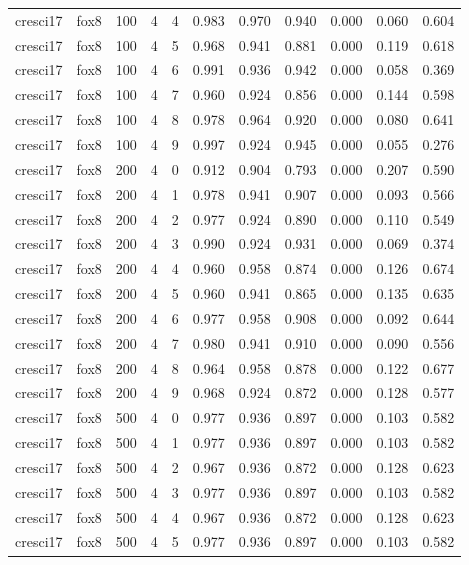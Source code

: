 \begin{tabular}{llrrrrrrrrr}
cresci17 & fox8 & 100 & 4 & 4 & 0.983 & 0.970 & 0.940 & 0.000 & 0.060 & 0.604 \\
cresci17 & fox8 & 100 & 4 & 5 & 0.968 & 0.941 & 0.881 & 0.000 & 0.119 & 0.618 \\
cresci17 & fox8 & 100 & 4 & 6 & 0.991 & 0.936 & 0.942 & 0.000 & 0.058 & 0.369 \\
cresci17 & fox8 & 100 & 4 & 7 & 0.960 & 0.924 & 0.856 & 0.000 & 0.144 & 0.598 \\
cresci17 & fox8 & 100 & 4 & 8 & 0.978 & 0.964 & 0.920 & 0.000 & 0.080 & 0.641 \\
cresci17 & fox8 & 100 & 4 & 9 & 0.997 & 0.924 & 0.945 & 0.000 & 0.055 & 0.276 \\
cresci17 & fox8 & 200 & 4 & 0 & 0.912 & 0.904 & 0.793 & 0.000 & 0.207 & 0.590 \\
cresci17 & fox8 & 200 & 4 & 1 & 0.978 & 0.941 & 0.907 & 0.000 & 0.093 & 0.566 \\
cresci17 & fox8 & 200 & 4 & 2 & 0.977 & 0.924 & 0.890 & 0.000 & 0.110 & 0.549 \\
cresci17 & fox8 & 200 & 4 & 3 & 0.990 & 0.924 & 0.931 & 0.000 & 0.069 & 0.374 \\
cresci17 & fox8 & 200 & 4 & 4 & 0.960 & 0.958 & 0.874 & 0.000 & 0.126 & 0.674 \\
cresci17 & fox8 & 200 & 4 & 5 & 0.960 & 0.941 & 0.865 & 0.000 & 0.135 & 0.635 \\
cresci17 & fox8 & 200 & 4 & 6 & 0.977 & 0.958 & 0.908 & 0.000 & 0.092 & 0.644 \\
cresci17 & fox8 & 200 & 4 & 7 & 0.980 & 0.941 & 0.910 & 0.000 & 0.090 & 0.556 \\
cresci17 & fox8 & 200 & 4 & 8 & 0.964 & 0.958 & 0.878 & 0.000 & 0.122 & 0.677 \\
cresci17 & fox8 & 200 & 4 & 9 & 0.968 & 0.924 & 0.872 & 0.000 & 0.128 & 0.577 \\
cresci17 & fox8 & 500 & 4 & 0 & 0.977 & 0.936 & 0.897 & 0.000 & 0.103 & 0.582 \\
cresci17 & fox8 & 500 & 4 & 1 & 0.977 & 0.936 & 0.897 & 0.000 & 0.103 & 0.582 \\
cresci17 & fox8 & 500 & 4 & 2 & 0.967 & 0.936 & 0.872 & 0.000 & 0.128 & 0.623 \\
cresci17 & fox8 & 500 & 4 & 3 & 0.977 & 0.936 & 0.897 & 0.000 & 0.103 & 0.582 \\
cresci17 & fox8 & 500 & 4 & 4 & 0.967 & 0.936 & 0.872 & 0.000 & 0.128 & 0.623 \\
cresci17 & fox8 & 500 & 4 & 5 & 0.977 & 0.936 & 0.897 & 0.000 & 0.103 & 0.582 \\

\end{tabular}
